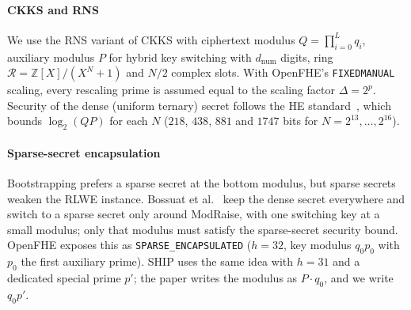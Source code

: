 \documentclass[sigconf,nonacm]{acmart}
\newcommand{\Z}{\mathbb{Z}}
\newcommand{\R}{\mathcal{R}}
\begin{document}
\paragraph{CKKS and RNS}
We use the RNS variant of CKKS with ciphertext modulus $Q=\prod_{i=0}^{L} q_i$, auxiliary modulus $P$ for hybrid key switching with $d_{\mathrm{num}}$ digits, ring $\R=\Z[X]/(X^N+1)$ and $N/2$ complex slots.
With OpenFHE's \texttt{FIXEDMANUAL} scaling, every rescaling prime is assumed equal to the scaling factor $\Delta=2^p$.
Security of the dense (uniform ternary) secret follows the HE standard~\cite{HEStd18}, which bounds $\log_2(QP)$ for each $N$ ($218$, $438$, $881$ and $1747$ bits for $N=2^{13},\dots,2^{16}$).

\paragraph{Sparse-secret encapsulation}
Bootstrapping prefers a sparse secret at the bottom modulus, but sparse secrets weaken the RLWE instance.
Bossuat et al.~\cite{BTH22} keep the dense secret everywhere and switch to a sparse secret only around ModRaise, with one switching key at a small modulus; only that modulus must satisfy the sparse-secret security bound.
OpenFHE exposes this as \texttt{SPARSE\_ENCAPSULATED} ($h=32$, key modulus $q_0p_0$ with $p_0$ the first auxiliary prime).
SHIP uses the same idea with $h=31$ and a dedicated special prime $p'$; the paper writes the modulus as $P\cdot q_0$, and we write $q_0p'$.
\end{document}
